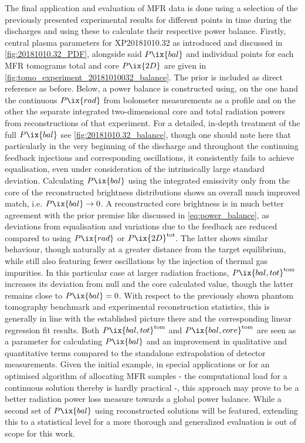                     The final application and evaluation of MFR data is done using a selection of the previously presented experimental results for different points in time during the discharges and using these to calculate their respective power balance. Firstly, central plasma parameters for XP20181010.32 as introduced and discussed in \cref{fig:20181010.32_PDF}, alongside said $P\ix{bal}$ and individual points for each MFR tomograms total and core $P\ix{2D}$ are given in \cref{fig:tomo_experiment_20181010032_balance}. The prior is included as direct reference as before. Below, a power balance is constructed using, on the one hand the continuous $P\ix{rad}$ from bolometer measurements as a profile and on the other the separate integrated two-dimensional core and total radiation powers from reconstructions of that experiment. For a detailed, in-depth treatment of the full $P\ix{bal}$ see \cref{fig:20181010.32_balance}, though one should note here that particularly in the very beginning of the discharge and throughout the continuing feedback injections and corresponding oscillations, it consistently fails to achieve equalisation, even under consideration of the intrinsically large standard deviation. Calculating $P\ix{bal}$ using the integrated emissivity only from the core of the reconstructed brightness distributions shows an overall much improved match, i.e. $P\ix{bal}\rightarrow0$. A reconstructed core brightness is in much better agreement with the prior premise like discussed in \cref{eq:power_balance}, as deviations from equalisation and variations due to the feedback are reduced compared to using $P\ix{rad}$ or $P\ix{2D}^{\text{tot}}$. The latter shows similar behaviour, though naturally at a greater distance from the target equilibrium, while still also featuring fewer oscillations by the injection of thermal gas impurities. In this particular case at larger radiation fractions, $P\ix{bal,tot}^{\text{tom}}$ increases its deviation from null and the core calculated value, though the latter remains close to $P\ix{bal}=0$. With respect to the previously shown phantom tomography benchmark and experimental reconstruction statistics, this is generally in line with the established picture there and the corresponding linear regression fit results. Both $P\ix{bal,tot}^{\text{tom}}$ and $P\ix{bal,core}^{\text{tom}}$ are seen as a parameter for calculating $P\ix{bal}$ and an improvement in qualitative and quantitative terms compared to the standalone extrapolation of detector measurements. Given the initial example, in special applications or for an optimised algorithm of allocating MFR samples - the computational load for a continuous solution thereby is hardly practical -, this approach may prove to be a better radiation power loss measure towards a global power balance. While a second set of $P\ix{bal}$ using reconstructed solutions will be featured, extending this to a statistical level for a more thorough and generalized evaluation is out of scope for this work.\\%
